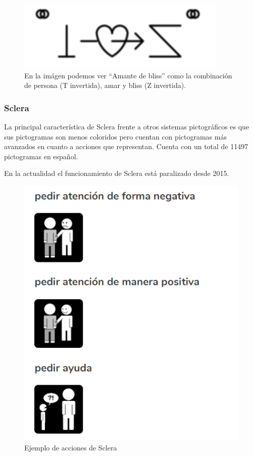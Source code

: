 \begin{figure}[h!]
	\centering
	\includegraphics[width=0.7\linewidth]{Imagenes/Bitmap/Blissymbolics}
	\caption{En la imágen podemos ver “Amante de bliss” como la combinación de persona (T invertida), amar y bliss (Z invertida).}
	\label{fig:blissymbolics}
\end{figure}


\subsubsection{Sclera}
La principal característica de Sclera frente a otros sistemas pictográficos es que sus pictogramas son menos coloridos pero cuentan con pictogramas más avanzados en cuanto a acciones que representan. Cuenta con un total de 11497 pictogramas en español.

En la actualidad el funcionamiento de Sclera está paralizado desde 2015.

\begin{figure}[h!]
	\centering
	\includegraphics[width=0.7\linewidth]{Imagenes/Bitmap/Sclera}
	\caption{Ejemplo de acciones de Sclera}
	\label{fig:sclera}
\end{figure}

